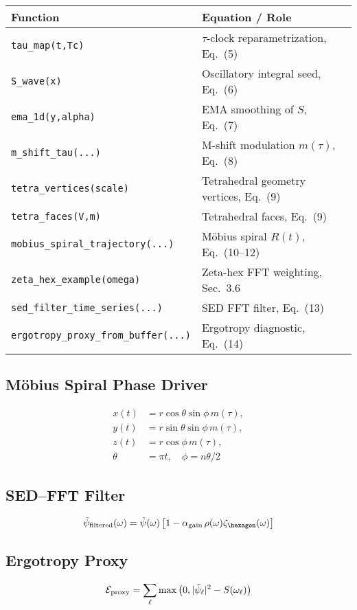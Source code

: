 \documentclass[12pt]{article}
\begin{document}
\begin{tabular}{l l}
\textbf{Function} & \textbf{Equation / Role} \\
\hline
\texttt{tau\_map(t,Tc)} & $\tau$-clock reparametrization, Eq.~(5) \\
\texttt{S\_wave(x)} & Oscillatory integral seed, Eq.~(6) \\
\texttt{ema\_1d(y,alpha)} & EMA smoothing of $S$, Eq.~(7) \\
\texttt{m\_shift\_tau(...)} & M-shift modulation $m(\tau)$, Eq.~(8) \\
\texttt{tetra\_vertices(scale)} & Tetrahedral geometry vertices, Eq.~(9) \\
\texttt{tetra\_faces(V,m)} & Tetrahedral faces, Eq.~(9) \\
\texttt{mobius\_spiral\_trajectory(...)} & Möbius spiral $R(t)$, Eq.~(10--12) \\
\texttt{zeta\_hex\_example(omega)} & Zeta-hex FFT weighting, Sec.~3.6 \\
\texttt{sed\_filter\_time\_series(...)} & SED FFT filter, Eq.~(13) \\
\texttt{ergotropy\_proxy\_from\_buffer(...)} & Ergotropy diagnostic, Eq.~(14) \\
\end{tabular}

\subsection{Möbius Spiral Phase Driver}
\begin{align}
x(t) &= r \cos\theta \sin\phi \, m(\tau), \\
y(t) &= r \sin\theta \sin\phi \, m(\tau), \\
z(t) &= r \cos\phi \, m(\tau), \\
\theta &= \pi t, \quad \phi = n \theta / 2
\end{align}

\subsection{SED--FFT Filter}
\begin{equation}
\tilde{\psi}_{\rm filtered}(\omega) = \tilde{\psi}(\omega)\left[1 - \alpha_{\rm gain} \, \rho(\omega) \zeta_{\hexagon}(\omega)\right]
\end{equation}

\subsection{Ergotropy Proxy}
\begin{equation}
\mathcal{E}_{\rm proxy} = \sum_\ell \max\left(0, |\tilde{\psi}_\ell|^2 - S(\omega_\ell)\right)
\end{equation}
\end{document}
